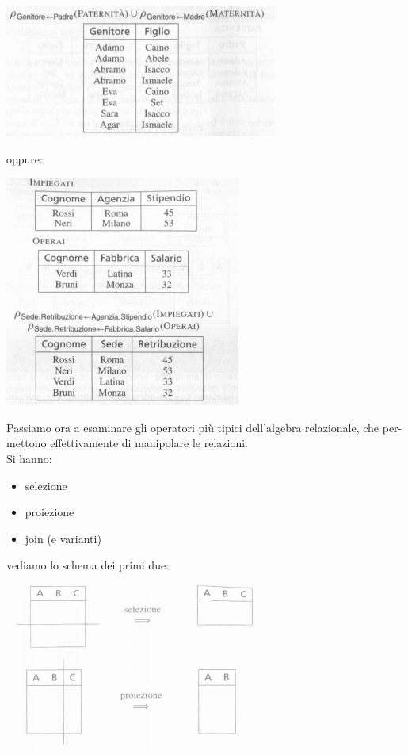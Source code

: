 \documentclass[a4paper,12pt, oneside]{book}
\begin{document}
\begin{center}
\includegraphics[scale=1]{img/alg3.png}
\end{center}
oppure:
\begin{center}
\includegraphics[scale=1]{img/alg4.png}
\end{center}
Passiamo ora a esaminare gli operatori più tipici dell'algebra relazionale, che per-
mettono effettivamente di manipolare le relazioni.\\
Si hanno:
\begin{itemize}
\item selezione
\item proiezione
\item join (e varianti)
\end{itemize}
vediamo lo schema dei primi due:
\begin{center}
\includegraphics[scale=0.7]{img/alg5.png}
\end{center}
\end{document}
